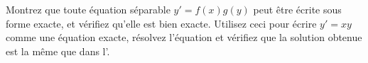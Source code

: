 \begin{exercise}
\leavevmode
\begin{tasks}
\task Montrez que toute équation séparable $y' = f(x)g(y)$ peut être écrite sous forme exacte, et vérifiez qu'elle est bien  exacte.
\task Utilisez ceci pour écrire $y' = xy$ comme une équation exacte, résolvez l'équation et vérifiez que la solution obtenue est la même que dans l'.
\end{tasks}
\end{exercise}


